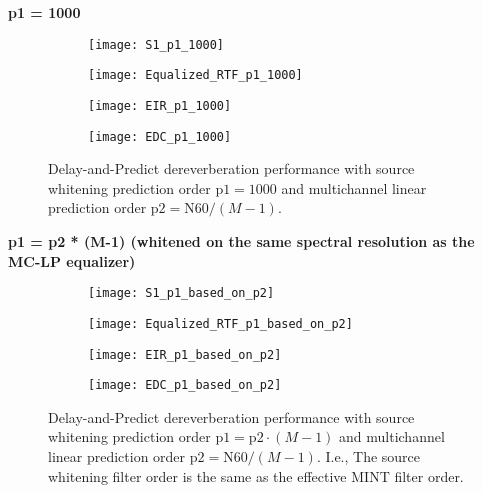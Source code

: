 \textbf{p1 = 1000}

\begin{figure}[H]
	\centering
	\begin{subfigure}[b]{0.49\textwidth}
		\centering
		\texttt{[image: S1\_p1\_1000]}
	\end{subfigure}
	\hfill
	\begin{subfigure}[b]{0.49\textwidth}
		\centering
		\texttt{[image: Equalized\_RTF\_p1\_1000]}
	\end{subfigure}
	\hfill
	\begin{subfigure}[b]{0.49\textwidth}
		\centering
		\texttt{[image: EIR\_p1\_1000]}
	\end{subfigure}
	\hfill
	\begin{subfigure}[b]{0.49\textwidth}
		\centering
		\texttt{[image: EDC\_p1\_1000]}
	\end{subfigure}
	\hfill
	\caption{Delay-and-Predict dereverberation performance with source whitening prediction order $\mathrm{p1} = 1000$ and multichannel linear prediction order $\mathrm{p2} = \mathrm{N60} / (M-1)$.}
	\label{fig:params_p1_1000}
\end{figure}

\textbf{p1 = p2 * (M-1) (whitened on the same spectral resolution as the MC-LP equalizer)}

\begin{figure}[H]
	\centering
	\begin{subfigure}[b]{0.49\textwidth}
		\centering
		\texttt{[image: S1\_p1\_based\_on\_p2]}
	\end{subfigure}
	\hfill
	\begin{subfigure}[b]{0.49\textwidth}
		\centering
		\texttt{[image: Equalized\_RTF\_p1\_based\_on\_p2]}
	\end{subfigure}
	\hfill
	\begin{subfigure}[b]{0.49\textwidth}
		\centering
		\texttt{[image: EIR\_p1\_based\_on\_p2]}
	\end{subfigure}
	\hfill
	\begin{subfigure}[b]{0.49\textwidth}
		\centering
		\texttt{[image: EDC\_p1\_based\_on\_p2]}
	\end{subfigure}
	\hfill
	\caption{Delay-and-Predict dereverberation performance with source whitening prediction order $\mathrm{p1} = \mathrm{p2} \cdot (M-1)$ and multichannel linear prediction order $\mathrm{p2} = \mathrm{N60} / (M-1)$. I.e., The source whitening filter order is the same as the effective MINT filter order.}
	\label{fig:params_p1_based_on_p2}
\end{figure}


